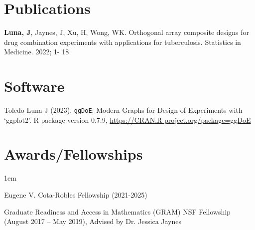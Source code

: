\documentclass[margin,line]{res}
\newenvironment{list1}{
  \begin{list}{\ding{113}}{
      \setlength{\itemsep}{0in}
      \setlength{\parsep}{0in} \setlength{\parskip}{0in}
      \setlength{\topsep}{0in} \setlength{\partopsep}{0in} 
      \setlength{\leftmargin}{0.20in}}}{\end{list}}
\begin{document}
\begin{resume}
\vspace{2ex}


\section{\sc Publications}
\begin{list1}
\item[] \textbf{Luna, J}, Jaynes, J, Xu, H, Wong, WK. Orthogonal array composite designs for drug combination experiments with applications for tuberculosis. Statistics in Medicine. 2022; 1- 18
\end{list1}

\vspace{1ex}

\section{\sc Software}
\begin{list1}
\item[] Toledo Luna J (2023). \verb|ggDoE|: Modern Graphs for Design of Experiments
  with `ggplot2'. R package version 0.7.9,
  \url{https://CRAN.R-project.org/package=ggDoE}
\end{list1}



\vspace{2ex}

\section{\sc Awards/\newline Fellowships}
\begin{list1}
\itemsep1em
\item[] Eugene V. Cota-Robles Fellowship (2021-2025)
\item[] Graduate Readiness and Access in Mathematics (GRAM) NSF Fellowship (August 2017 -- May 2019), Advised by Dr. Jessica Jaynes 
\end{list1}


\vspace{2ex}



\end{resume}
\end{document}
